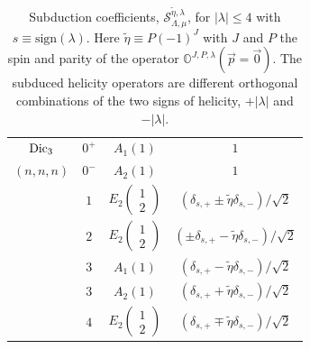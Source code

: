 \begin{table}
\begin{centering}
\begin{tabular}{c|c|c|c}
\hline
$\text{Dic}_{3}$
 & $0^+$ & $A_1(1)$ & $1$ \\
$(n,n,n)$
 & $0^-$ & $A_2(1)$ & $1$ \\
 & $1$   & $E_2\left(\begin{smallmatrix}1 \\ 2\end{smallmatrix}\right)$ & $(\delta_{s,+} \pm \tilde{\eta} \delta_{s,-})/\sqrt{2}$ \\
 & $2$   & $E_2\left(\begin{smallmatrix}1 \\ 2\end{smallmatrix}\right)$ & $(\pm\delta_{s,+} - \tilde{\eta} \delta_{s,-})/\sqrt{2}$ \\
 & $3$   & $A_1(1)$ & $(\delta_{s,+} - \tilde{\eta} \delta_{s,-})/\sqrt{2}$ \\
 & $3$   & $A_2(1)$ & $(\delta_{s,+} + \tilde{\eta} \delta_{s,-})/\sqrt{2}$ \\
 & $4$   & $E_2\left(\begin{smallmatrix}1 \\ 2\end{smallmatrix}\right)$ & $(\delta_{s,+} \mp \tilde{\eta} \delta_{s,-})/\sqrt{2}$ \\
\hline
\end{tabular}
\caption{Subduction coefficients, $\mathcal{S}_{\Lambda,\mu}^{\tilde{\eta},\lambda}$, for $|\lambda| \leq 4$ with $s \equiv \text{sign}(\lambda)$. Here $\tilde{\eta} \equiv P(-1)^J$ with $J$ and $P$ the spin and parity of the operator $\mathbb{O}^{J,P,\lambda}(\vec{p}=\vec{0})$.  The subduced helicity operators are different orthogonal combinations of the two signs of helicity, $+|\lambda|$ and $-|\lambda|$. }
\label{tab::subductions}
\end{centering}
\end{table} 

\clearpage







